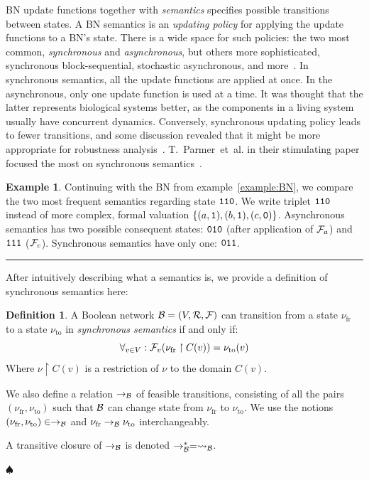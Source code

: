 \documentclass[
	digital, oneside, nosansbold, nocolorbold, nolot, nolof
]{fithesis4}
\theoremstyle{definition}
\newtheorem{definition}{Definition}
\theoremstyle{definition}
\newtheorem{example}{Example}
\newenvironment{ldefinition}
    {\begin{definition}}
	{\par\hspace{\stretch{1}}$\spadesuit$\hspace{\stretch{1}}
     \par\end{definition}}
\newenvironment{lexample}
    {\begin{example}}
    {\par\hspace{\stretch{1}}\rule{0.2\textwidth}{0.01ex}\hspace{\stretch{1}}
     \par\end{example}}
\DeclarePairedDelimiter{\set}{\{}{\}}
\begin{document}
BN update functions together with \emph{semantics} specifies possible
transitions between states. A BN semantics is an \emph{updating policy} for
applying the update functions to a BN's state. There is a wide space for such
policies: the two most common, \emph{synchronous} and \emph{asynchronous}, but
others more sophisticated, synchronous block-sequential, stochastic
asynchronous, and more~\cite{colomoto}. In synchronous semantics, all the
update functions are applied at once. In the asynchronous, only one update
function is used at a time. It was thought that the latter represents
biological systems better, as the components in a living system usually have
concurrent dynamics. Conversely, synchronous updating policy leads to fewer
transitions, and some discussion revealed that it might be more appropriate for
robustness analysis~\cite{concepts_bn}. T.~Parmer~et~al. in their stimulating
paper focused the most on synchronous semantics~\cite{infl_max_BN}.

\begin{lexample}
Continuing with the BN from example~\ref{example:BN}, we compare the two most
frequent semantics regarding state $\mathtt{110}$. We write triplet
$\mathtt{110}$ instead of more complex, formal valuation $\set{(a, \state{1}),
(b, \state{1}), (c, \state{0})}$. Asynchronous semantics has two possible
consequent states: $\mathtt{010}$ (after application of $\mathcal{F}_a$) and
$\mathtt{111}$ ($\mathcal{F}_c$).  Synchronous semantics have only one:
$\mathtt{011}$.
\end{lexample}

After intuitively describing what a semantics is, we provide a definition of
synchronous semantics here:
\begin{ldefinition}
A Boolean network $\mathcal{B} = (V, \mathcal{R}, \mathcal{F})$ can transition from a
state $\nu_{\text{fr}}$ to a state $\nu_{\text{to}}$ in \emph{synchronous
semantics} if and only if:
\[
    \forall_{v \in V} : \mathcal{F}_v(\nu_{\text{fr}}\restriction C(v)) =
    \nu_{\text{to}}(v)
\]
Where $\nu\restriction C(v)$ is a restriction of $\nu$ to the domain $C(v)$.

We also define a relation $\to_{\mathcal{B}}$ of feasible transitions, consisting of
all the pairs $(\nu_{\text{fr}}, \nu_{\text{to}})$ such that $\mathcal{B}$
can change state from $\nu_{\text{fr}}$ to $\nu_{\text{to}}$. We use the notions
$(\nu_{\text{fr}}, \nu_{\text{to}}) \in \to_{\mathcal{B}}$ and
$\nu_{\text{fr}} \to_{\mathcal{B}} \nu_{\text{to}}$ interchangeably.

A transitive closure of $\to_{\mathcal{B}}$ is denoted $\to_{\mathcal{B}}^* = \rightsquigarrow_{\mathcal{B}}$.
\end{ldefinition}
\end{document}
